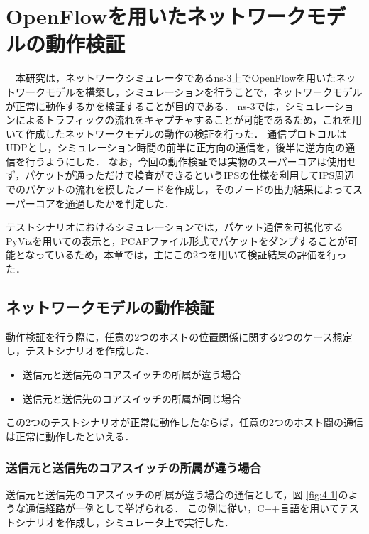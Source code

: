 \chapter{OpenFlowを用いたネットワークモデルの動作検証}

　本研究は，ネットワークシミュレータであるns-3上でOpenFlowを用いたネットワークモデルを構築し，シミュレーションを行うことで，ネットワークモデルが正常に動作するかを検証することが目的である．
ns-3では，シミュレーションによるトラフィックの流れをキャプチャすることが可能であるため，これを用いて作成したネットワークモデルの動作の検証を行った．
通信プロトコルはUDPとし，シミュレーション時間の前半に正方向の通信を，後半に逆方向の通信を行うようにした．
なお，今回の動作検証では実物のスーパーコアは使用せず，パケットが通っただけで検査ができるというIPSの仕様を利用してIPS周辺でのパケットの流れを模したノードを作成し，そのノードの出力結果によってスーパーコアを通過したかを判定した．

テストシナリオにおけるシミュレーションでは，パケット通信を可視化するPyVizを用いての表示と，PCAPファイル形式でパケットをダンプすることが可能となっているため，本章では，主にこの2つを用いて検証結果の評価を行った．

\section{ネットワークモデルの動作検証}

動作検証を行う際に，任意の2つのホストの位置関係に関する2つのケース想定し，テストシナリオを作成した．

\begin{itemize}
	\item 送信元と送信先のコアスイッチの所属が違う場合
	\item 送信元と送信先のコアスイッチの所属が同じ場合
\end{itemize}

この2つのテストシナリオが正常に動作したならば，任意の2つのホスト間の通信は正常に動作したといえる．

\subsection{送信元と送信先のコアスイッチの所属が違う場合}

送信元と送信先のコアスイッチの所属が違う場合の通信として，図 \ref{fig:4-1}のような通信経路が一例として挙げられる．
この例に従い，C++言語を用いてテストシナリオを作成し，シミュレータ上で実行した．

